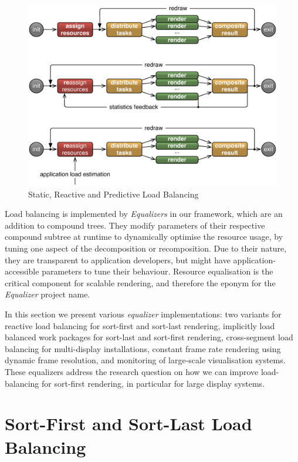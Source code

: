 \begin{figure}[h!t]
  \includegraphics[width=\textwidth]{images/loadBalancing}
  \caption{\label{floadbalancing}Static, Reactive and Predictive Load Balancing}
\end{figure}

Load balancing is implemented by {\em Equalizers} in our framework, which are
an addition to compound trees. They modify parameters of their respective
compound subtree at runtime to dynamically optimise the resource usage, by
tuning one aspect of the decomposition or recomposition. Due to their nature,
they are transparent to application developers, but might have
application-accessible parameters to tune their behaviour. Resource
equalisation is the critical component for scalable rendering, and therefore
the eponym for the {\em Equalizer} project name.

In this section we present various {\em equalizer} implementations: two
variants for reactive load balancing for sort-first and sort-last rendering,
implicitly load balanced work packages for sort-last and sort-first rendering,
cross-segment load balancing for multi-display installations, constant frame
rate rendering using dynamic frame resolution, and monitoring of large-scale
visualisation systems. These equalizers address the research question on how we
can improve load-balancing for sort-first rendering, in particular for large
display systems.

\section{Sort-First and Sort-Last Load Balancing}\label{sLoadEqualizer}

